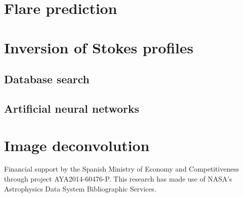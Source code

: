 \section{Flare prediction}

\section{Inversion of Stokes profiles}

\subsection{Database search}
\subsection{Artificial neural networks}

\section{Image deconvolution}


\begin{acknowledgements}
Financial support by the Spanish Ministry of Economy and Competitiveness through project AYA2014-60476-P. This research has made use of NASA's Astrophysics Data System Bibliographic Services.
\end{acknowledgements}


%
%



